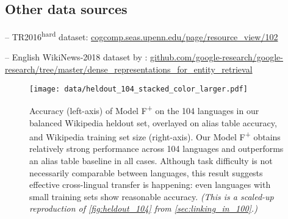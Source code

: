 \documentclass[11pt,a4paper]{article}
\newcommand*{\TR}{TR2016\textsuperscript{hard}}
\begin{document}
\subsection{Other data sources}\label{appsep:otherdata}
-- \TR{} dataset:
\url{cogcomp.seas.upenn.edu/page/resource_view/102}


\noindent -- English WikiNews-2018 dataset by \cite{gillick-etal-2019-learning}: \url{github.com/google-research/google-research/tree/master/dense_representations_for_entity_retrieval}
        
\renewcommand{\thefigure}{B\arabic{figure}}
\setcounter{figure}{0}
\begin{sidewaysfigure*}
  \centering
  \texttt{[image: data/heldout\_104\_stacked\_color\_larger.pdf]}
  \caption{ Accuracy (left-axis) of Model F\textsuperscript{+} on the 104 languages in our balanced Wikipedia heldout set, overlayed on alias table accuracy, and Wikipedia training set size (right-axis).
  Our Model F\textsuperscript{+} obtains relatively strong performance across 104 languages and outperforms an alias table baseline in all cases.
  Although task difficulty is not necessarily comparable between languages, this result suggests effective cross-lingual transfer is happening: even languages with small training sets show reasonable accuracy.
  \emph{(This is a scaled-up reproduction of \autoref{fig:heldout_104} from \autoref{sec:linking_in_100}.)}
  \label{fig:heldout_104_larger}}
\end{sidewaysfigure*}
        
\end{document}
